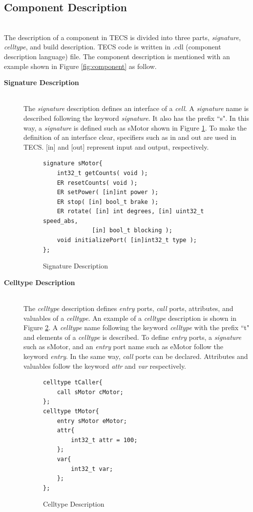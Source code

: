 \documentclass[a4j,12pt,oneside,openany,english]{jsbook}
\begin{document}
\subsection{Component Description}\mbox{}\\

The description of a component in TECS is divided into three parts, {\it signature}, {\it celltype}, and build description.
TECS code is written in .cdl (component description language) file.
The component description is mentioned with an example shown in Figure \ref{fig:component} as follow.

\begin{description}
    \item[{\bf Signature Description}]\mbox{}\\
        The {\it signature} description defines an interface of a {\it cell}.
        A {\it signature} name is described following the keyword {\it signature}.
        It also has the prefix ``s".
        In this way, a {\it signature} is defined such as sMotor shown in Figure \ref{signature}.
        To make the definition of an interface clear, specifiers such as in and out are used in TECS.
        [in] and [out] represent input and output, respectively.\\
\begin{figure}[t]
\centering
\begin{lstlisting}
signature sMotor{
    int32_t getCounts( void );
    ER resetCounts( void );
    ER setPower( [in]int power );
    ER stop( [in] bool_t brake );
    ER rotate( [in] int degrees, [in] uint32_t speed_abs,
              [in] bool_t blocking );
    void initializePort( [in]int32_t type );
};
\end{lstlisting}
\caption{Signature Description}
\label{signature}
\end{figure}

    \item[{\bf Celltype Description}]\mbox{}\\
        The {\it celltype} description defines {\it entry} ports, {\it call} ports, attributes, and valuables of a {\it celltype}.
        An example of a {\it celltype} description is shown in Figure \ref{celltype}.
        A {\it celltype} name following the keyword {\it celltype} with the prefix ``t" and elements of a {\it celltype} is described.
        To define {\it entry} ports, a {\it signature} such as sMotor, and an {\it entry} port name such as eMotor follow the keyword {\it entry}.
        In the same way, {\it call} ports can be declared.
        Attributes and valuables follow the keyword {\it attr} and {\it var} respectively.\\
\begin{figure}[t]
\centering
\begin{lstlisting}
celltype tCaller{
    call sMotor cMotor;
};
celltype tMotor{
    entry sMotor eMotor;
    attr{
        int32_t attr = 100;
    };
    var{
        int32_t var;
    };
};
\end{lstlisting}
\caption{Celltype Description}
\label{celltype}
\end{figure}


\end{description}
\end{document}
